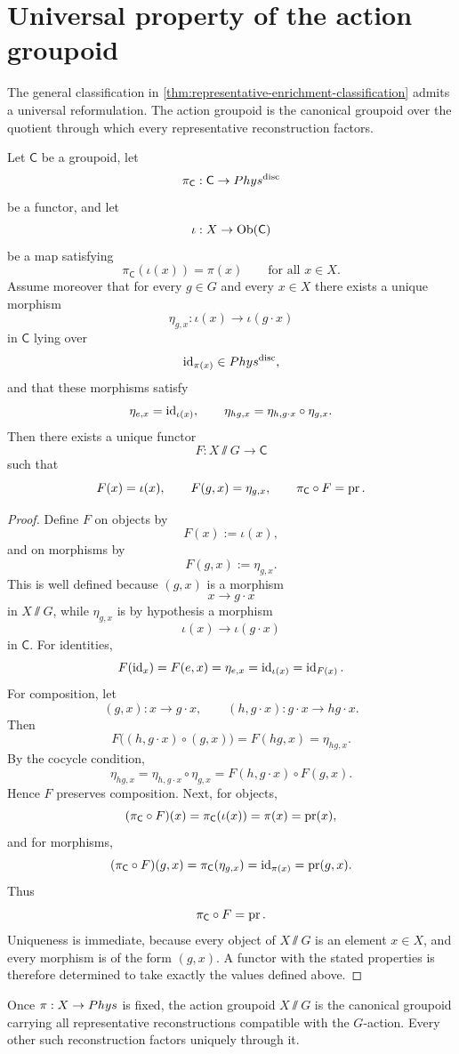 \section{Universal property of the action groupoid}
The general classification in
\cref{thm:representative-enrichment-classification} admits a universal
reformulation.
The action groupoid is the canonical groupoid over the quotient through
which every representative reconstruction factors.
\begin{theorem}
	Let \(\mathsf C\) be a groupoid, let
	\[
		\pi_{\mathsf C}:\mathsf C\to Phys^{\mathrm{disc}}
	\]
	be a functor, and let
	\[
		\iota:X\to \operatorname{Ob}(\mathsf C)
	\]
	be a map satisfying
	\[
		\pi_{\mathsf C}(\iota(x))=\pi(x)
		\qquad
		\text{for all }x\in X.
	\]
	Assume moreover that for every \(g\in G\) and every \(x\in X\) there
	exists a unique morphism
	\[
		\eta_{g,x}:\iota(x)\to \iota(g\cdot x)
	\]
	in \(\mathsf C\) lying over
	\[
		\operatorname{id}_{\pi(x)}\in Phys^{\mathrm{disc}},
	\]
	and that these morphisms satisfy
	\[
		\eta_{e,x}=\operatorname{id}_{\iota(x)},
		\qquad
		\eta_{hg,x}=\eta_{h,g\cdot x}\circ \eta_{g,x}.
	\]
	Then there exists a unique functor
	\[
		F:X\sslash G\to \mathsf C
	\]
	such that
	\[
		F(x)=\iota(x),
		\qquad
		F(g,x)=\eta_{g,x},
		\qquad
		\pi_{\mathsf C}\circ F=\operatorname{pr}.
	\]
\end{theorem}
\begin{proof}
	Define \(F\) on objects by
	\[
		F(x):=\iota(x),
	\]
	and on morphisms by
	\[
		F(g,x):=\eta_{g,x}.
	\]
	This is well defined because \((g,x)\) is a morphism
	\[
		x\to g\cdot x
	\]
	in \(X\sslash G\), while \(\eta_{g,x}\) is by hypothesis a morphism
	\[
		\iota(x)\to \iota(g\cdot x)
	\]
	in \(\mathsf C\).
	For identities,
	\[
		F(\operatorname{id}_x)=F(e,x)=\eta_{e,x}=\operatorname{id}_{\iota(x)}=\operatorname{id}_{F(x)}.
	\]
	For composition, let
	\[
		(g,x):x\to g\cdot x,
		\qquad
		(h,g\cdot x):g\cdot x\to hg\cdot x.
	\]
	Then
	\[
		F\bigl((h,g\cdot x)\circ(g,x)\bigr)
		=
		F(hg,x)
		=
		\eta_{hg,x}.
	\]
	By the cocycle condition,
	\[
		\eta_{hg,x}
		=
		\eta_{h,g\cdot x}\circ\eta_{g,x}
		=
		F(h,g\cdot x)\circ F(g,x).
	\]
	Hence \(F\) preserves composition.
	Next, for objects,
	\[
		(\pi_{\mathsf C}\circ F)(x)=\pi_{\mathsf C}(\iota(x))=\pi(x)=\operatorname{pr}(x),
	\]
	and for morphisms,
	\[
		(\pi_{\mathsf C}\circ F)(g,x)=\pi_{\mathsf C}(\eta_{g,x})=\operatorname{id}_{\pi(x)}=\operatorname{pr}(g,x).
	\]
	Thus
	\[
		\pi_{\mathsf C}\circ F=\operatorname{pr}.
	\]
	Uniqueness is immediate, because every object of \(X\sslash G\) is an
	element \(x\in X\), and every morphism is of the form \((g,x)\).  A
	functor with the stated properties is therefore determined to take exactly
	the values defined above.
\end{proof}
\begin{remark}
	Once \(\pi:X\to Phys\) is fixed, the action groupoid \(X\sslash G\) is
	the canonical groupoid carrying all representative reconstructions
	compatible with the \(G\)-action.  Every other such reconstruction
	factors uniquely through it.
\end{remark}
